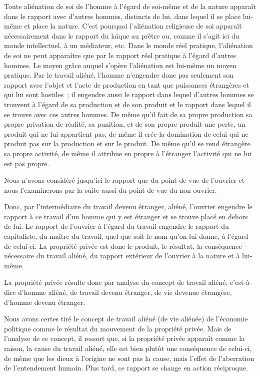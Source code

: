 \documentclass[french,twoside]{book} %
\begin{document}
Toute aliénation de soi de l’homme à l’égard de soi-même et de la nature apparaît dans le rapport avec d’autres hommes, distincts de lui, dans lequel il se place lui-même et place la nature. C’est pourquoi l’aliénation religieuse de soi apparaît nécessairement dans le rapport du laïque au prêtre ou, comme il s’agit ici du monde intellectuel, à un médiateur, etc. Dans le monde réel pratique, l’aliénation de soi ne peut apparaître que par le rapport réel pratique à l’égard d’autres hommes. Le moyen grâce auquel s’opère l’aliénation est lui-même un moyen pratique. Par le travail aliéné, l’homme n’engendre donc pas seulement son rapport avec l’objet et l’acte de production en tant que puissances étrangères et qui lui sont hostiles ; il engendre aussi le rapport dans lequel d’autres hommes se trouvent à l’égard de sa production et de son produit et le rapport dans lequel il se trouve avec ces autres hommes. De même qu’il fait de sa propre production sa propre privation de réalité, sa punition, et de son propre produit une perte, un produit qui ne lui appartient pas, de même il crée la domination de celui qui ne produit pas sur la production et sur le produit. De même qu’il se rend étrangère sa propre activité, de même il attribue en propre à l’étranger l’activité qui ne lui est pas propre.\par
Nous n’avons considéré jusqu’ici le rapport que du point de vue de l’ouvrier et nous l’examinerons par la suite aussi du point de vue du non-ouvrier.\par
Donc, par l’intermédiaire du travail devenu étranger, aliéné, l’ouvrier engendre le rapport à ce travail d’un homme qui y est étranger et se trouve placé en dehors de lui. Le rapport de l’ouvrier à l’égard du travail engendre le rapport du capitaliste, du maître du travail, quel que soit le nom qu’on lui donne, à l’égard de celui-ci. La propriété privée est donc le produit, le résultat, la conséquence nécessaire du travail aliéné, du rapport extérieur de l’ouvrier à la nature et à lui-même.\par
La propriété privée résulte donc par analyse du concept de travail aliéné, c’est-à-dire d’homme aliéné, de travail devenu étranger, de vie devenue étrangère, d’homme devenu étranger.\par
Nous avons certes tiré le concept de travail aliéné (de vie aliénée) de l’économie politique comme le résultat du mouvement de la propriété privée. Mais de l’analyse de ce concept, il ressort que, si la propriété privée apparaît comme la raison, la cause du travail aliéné, elle est bien plutôt une conséquence de celui-ci, de même que les dieux à l’origine ne sont pas la cause, mais l’effet de l’aberration de l’entendement humain. Plus tard, ce rapport se change en action réciproque.\par
\end{document}
